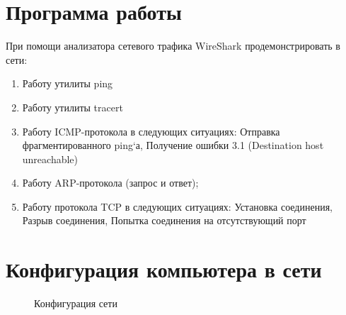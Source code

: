 \documentclass[a4paper, 14pt,russian]{article}
\begin{document}
\section{Программа работы}
При помощи анализатора сетевого трафика WireShark продемонстрировать в сети:
\begin{enumerate}
	
	\item Работу утилиты ping
	\item Работу утилиты tracert
	\item Работу ICMP-протокола в следующих ситуациях:
	\subitem Отправка фрагментированного ping`а,
	\subitem Получение ошибки 3.1 (Destination host unreachable)
	\item Работу ARP-протокола (запрос и ответ);
	\item Работу протокола TCP в следующих ситуациях:
	\subitem Установка соединения,
	\subitem Разрыв соединения,
	\subitem Попытка соединения на отсутствующий порт
\end{enumerate}

\section{Конфигурация компьютера в сети}
\begin{figure}[h]
	\caption{Конфигурация сети}
	\label{img:system}
\end{figure}
\end{document}
